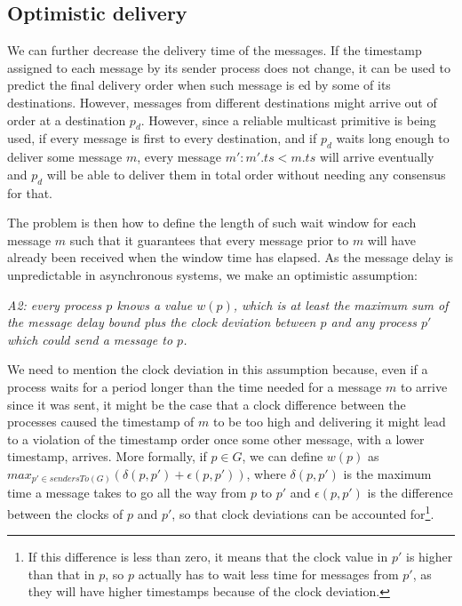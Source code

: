 \documentclass[times, 10pt]{article}
\begin{document}
\subsection{Optimistic delivery}

We can further decrease the delivery time of the messages. If the timestamp assigned to each message by its sender process does not change, it can be used to predict the final delivery order when such message is \rmd{}ed by some of its destinations. However, messages from different destinations might arrive out of order at a destination $p_d$. However, since a reliable multicast primitive is being used, if every message is first \rmc{} to every destination, and if $p_d$ waits long enough to deliver some message $m$, every message $m' : m'.ts < m.ts$ will arrive eventually and $p_d$ will be able to deliver them in total order without needing any consensus for that.

The problem is then how to define the length of such wait window for each message $m$ such that it guarantees that every message prior to $m$ will have already been received when the window time has elapsed. As the message delay is unpredictable in asynchronous systems, we make an optimistic assumption:

\begin{center}
\emph{A2: every process $p$ knows a value $w(p)$, which is at least the maximum sum of the message delay bound plus the clock deviation between $p$ and any process $p'$ which could send a message to $p$.}
\end{center}

We need to mention the clock deviation in this assumption because, even if a process waits for a period longer than the time needed for a message $m$ to arrive since it was sent, it might be the case that a clock difference between the processes caused the timestamp of $m$ to be too high and delivering it might lead to a violation of the timestamp order once some other message, with a lower timestamp, arrives. More formally, if $p \in G$, we can define $w(p)$ as $max_{p' \in sendersTo(G)}(\delta(p,p')+\epsilon(p,p'))$, where $\delta(p,p')$ is the maximum time a message takes to go all the way from $p$ to $p'$ and $\epsilon(p,p')$ is the difference between the clocks of $p$ and $p'$, so that clock deviations can be accounted for\footnote{If this difference is less than zero, it means that the clock value in $p'$ is higher than that in $p$, so $p$ actually has to wait less time for messages from $p'$, as they will have higher timestamps because of the clock deviation.}.
\end{document}
